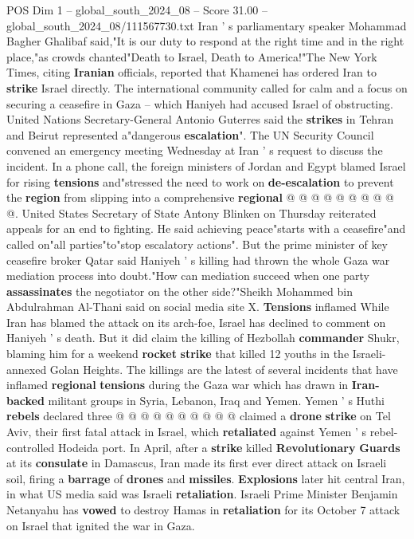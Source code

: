 \begin{textsample}{POS Dim 1 – global\_south\_2024\_08 – Score 31.00 – global\_south\_2024\_08/111567730.txt}
Iran ' s parliamentary speaker Mohammad Bagher Ghalibaf said,"It is our duty to respond at the right time and in the right place,"as crowds chanted"Death to Israel, Death to America!"The New York Times, citing \textbf{Iranian} officials, reported that Khamenei has ordered Iran to \textbf{strike} Israel directly.
The international community called for calm and a focus on securing a ceasefire in Gaza -- which Haniyeh had accused Israel of obstructing.
United Nations Secretary-General Antonio Guterres said the \textbf{strikes} in Tehran and Beirut represented a"dangerous \textbf{escalation}".
The UN Security Council convened an emergency meeting Wednesday at Iran ' s request to discuss the incident.
In a phone call, the foreign ministers of Jordan and Egypt blamed Israel for rising \textbf{tensions} and"stressed the need to work on \textbf{de-escalation} to prevent the \textbf{region} from slipping into a comprehensive \textbf{regional} @ @ @ @ @ @ @ @ @ @.
United States Secretary of State Antony Blinken on Thursday reiterated appeals for an end to fighting.
He said achieving peace"starts with a ceasefire"and called on"all parties"to"stop escalatory actions".
But the prime minister of key ceasefire broker Qatar said Haniyeh ' s killing had thrown the whole Gaza war mediation process into doubt."How can mediation succeed when one party \textbf{assassinates} the negotiator on the other side?"Sheikh Mohammed bin Abdulrahman Al-Thani said on social media site X. \textbf{Tensions} inflamed While Iran has blamed the attack on its arch-foe, Israel has declined to comment on Haniyeh ' s death.
But it did claim the killing of Hezbollah \textbf{commander} Shukr, blaming him for a weekend \textbf{rocket} \textbf{strike} that killed 12 youths in the Israeli-annexed Golan Heights.
The killings are the latest of several incidents that have inflamed \textbf{regional} \textbf{tensions} during the Gaza war which has drawn in \textbf{Iran-backed} militant groups in Syria, Lebanon, Iraq and Yemen.
Yemen ' s Huthi \textbf{rebels} declared three @ @ @ @ @ @ @ @ @ @ claimed a \textbf{drone} \textbf{strike} on Tel Aviv, their first fatal attack in Israel, which \textbf{retaliated} against Yemen ' s rebel-controlled Hodeida port.
In April, after a \textbf{strike} killed \textbf{Revolutionary} \textbf{Guards} at its \textbf{consulate} in Damascus, Iran made its first ever direct attack on Israeli soil, firing a \textbf{barrage} of \textbf{drones} and \textbf{missiles}. \textbf{Explosions} later hit central Iran, in what US media said was Israeli \textbf{retaliation}.
Israeli Prime Minister Benjamin Netanyahu has \textbf{vowed} to destroy Hamas in \textbf{retaliation} for its October 7 attack on Israel that ignited the war in Gaza.

\end{textsample}
